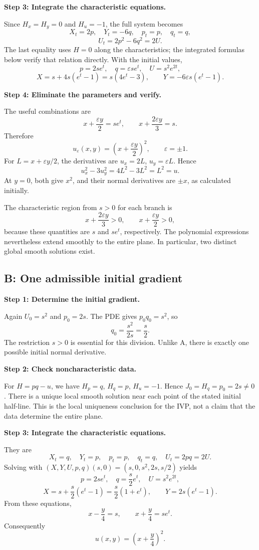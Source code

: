 \documentclass[11pt,a4paper]{article}
\newcommand{\step}[1]{\par\medskip\textbf{#1}\par}
\newcommand{\answer}[1]{\begin{equation*}\boxed{\displaystyle #1}\end{equation*}}
\begin{document}
\step{Step 3: Integrate the characteristic equations.}
Since $H_x=H_y=0$ and $H_u=-1$, the full system becomes
\[
 X_t=2p,\quad Y_t=-6q,\quad p_t=p,\quad q_t=q,
\]
\[
 U_t=2p^2-6q^2=2U.
\]
The last equality uses $H=0$ along the characteristics; the integrated formulas below verify that relation directly. With the initial values,
\[
 p=2se^t,\quad q=\varepsilon se^t,\quad U=s^2e^{2t},
\]
\[
 X=s+4s(e^t-1)=s(4e^t-3),\qquad
 Y=-6\varepsilon s(e^t-1).
\]

\step{Step 4: Eliminate the parameters and verify.}
The useful combinations are
\[
 x+\frac{\varepsilon y}{2}=se^t,\qquad
 x+\frac{2\varepsilon y}{3}=s.
\]
Therefore
\answer{u_{\varepsilon}(x,y)=\left(x+\frac{\varepsilon y}{2}\right)^2,
 \qquad\varepsilon=\pm1.}
For $L=x+\varepsilon y/2$, the derivatives are $u_x=2L$, $u_y=\varepsilon L$. Hence
\[
 u_x^2-3u_y^2=4L^2-3L^2=L^2=u.
\]
At $y=0$, both give $x^2$, and their normal derivatives are $\pm x$, as calculated initially.

The characteristic region from $s>0$ for each branch is
\[
 x+\frac{2\varepsilon y}{3}>0,\qquad
 x+\frac{\varepsilon y}{2}>0,
\]
because these quantities are $s$ and $se^t$, respectively. The polynomial expressions nevertheless extend smoothly to the entire plane. In particular, two distinct global smooth solutions exist.

\subsection*{B: One admissible initial gradient}
\step{Step 1: Determine the initial gradient.}
Again $U_0=s^2$ and $p_0=2s$. The PDE gives $p_0q_0=s^2$, so
\[
 q_0=\frac{s^2}{2s}=\frac{s}{2}.
\]
The restriction $s>0$ is essential for this division. Unlike A, there is exactly one possible initial normal derivative.

\step{Step 2: Check noncharacteristic data.}
For $H=pq-u$, we have $H_p=q$, $H_q=p$, $H_u=-1$. Hence $J_0=H_q=p_0=2s\ne0$. There is a unique local smooth solution near each point of the stated initial half-line. This is the local uniqueness conclusion for the IVP, not a claim that the data determine the entire plane.

\step{Step 3: Integrate the characteristic equations.}
They are
\[
 X_t=q,\quad Y_t=p,\quad p_t=p,\quad q_t=q,\quad U_t=2pq=2U.
\]
Solving with $(X,Y,U,p,q)(s,0)=(s,0,s^2,2s,s/2)$ yields
\[
 p=2se^t,\quad q=\frac s2 e^t,\quad U=s^2e^{2t},
\]
\[
 X=s+\frac s2(e^t-1)=\frac s2(1+e^t),\qquad
 Y=2s(e^t-1).
\]
From these equations,
\[
 x-\frac y4=s,\qquad x+\frac y4=se^t.
\]
Consequently
\answer{u(x,y)=\left(x+\frac y4\right)^2.}
\end{document}
